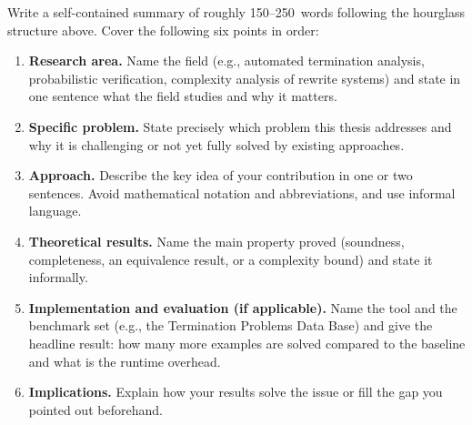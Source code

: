 \bigskip

Write a self-contained summary of roughly 150--250~words following the hourglass
structure above.
Cover the following six points in order:
\begin{enumerate}
    \item \textbf{Research area.}
          Name the field (e.g., automated termination analysis, probabilistic
          verification, complexity analysis of rewrite systems) and state in one
          sentence what the field studies and why it matters.
    \item \textbf{Specific problem.}
          State precisely which problem this thesis addresses and why it is
          challenging or not yet fully solved by existing approaches.
    \item \textbf{Approach.}
          Describe the key idea of your contribution in one or two sentences.
          Avoid mathematical notation and abbreviations, and use informal language.
    \item \textbf{Theoretical results.}
          Name the main property proved (soundness, completeness, an equivalence
          result, or a complexity bound) and state it informally.
    \item \textbf{Implementation and evaluation (if applicable).}
          Name the tool and the benchmark set (e.g., the Termination Problems
          Data Base) and give the headline result: how many more examples are
          solved compared to the baseline and what is the runtime overhead.
    \item \textbf{Implications.}
          Explain how your results solve the issue or fill the gap you pointed
          out beforehand.
\end{enumerate}